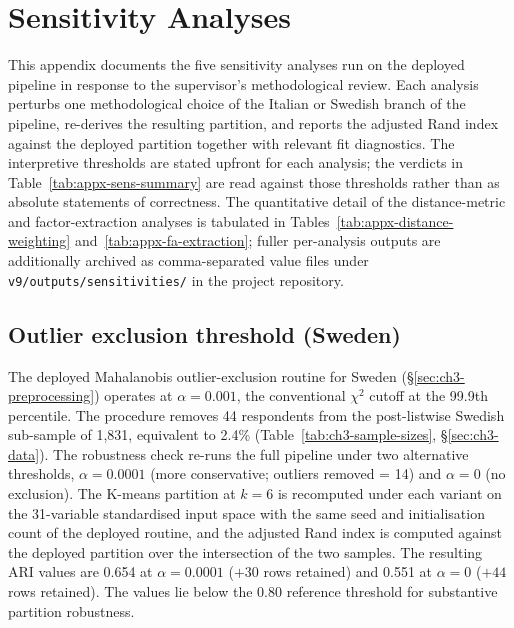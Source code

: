 \chapter{Sensitivity Analyses}
\label{ch:appx-sens}

This appendix documents the five sensitivity analyses run on the deployed pipeline in response to the supervisor's methodological review. Each analysis perturbs one methodological choice of the Italian or Swedish branch of the pipeline, re-derives the resulting partition, and reports the adjusted Rand index against the deployed partition together with relevant fit diagnostics. The interpretive thresholds are stated upfront for each analysis; the verdicts in Table~\ref{tab:appx-sens-summary} are read against those thresholds rather than as absolute statements of correctness. The quantitative detail of the distance-metric and factor-extraction analyses is tabulated in Tables~\ref{tab:appx-distance-weighting} and~\ref{tab:appx-fa-extraction}; fuller per-analysis outputs are additionally archived as comma-separated value files under \texttt{v9/outputs/sensitivities/} in the project repository.


\section{Outlier exclusion threshold (Sweden)}
\label{sec:appx-sens-outlier}

The deployed Mahalanobis outlier-exclusion routine for Sweden (\S\ref{sec:ch3-preprocessing}) operates at $\alpha = 0.001$, the conventional $\chi^2$ cutoff at the 99.9th percentile. The procedure removes 44 respondents from the post-listwise Swedish sub-sample of 1{,}831, equivalent to 2.4\% (Table~\ref{tab:ch3-sample-sizes}, \S\ref{sec:ch3-data}). The robustness check re-runs the full pipeline under two alternative thresholds, $\alpha = 0.0001$ (more conservative; outliers removed = 14) and $\alpha = 0$ (no exclusion). The K-means partition at $k = 6$ is recomputed under each variant on the 31-variable standardised input space with the same seed and initialisation count of the deployed routine, and the adjusted Rand index is computed against the deployed partition over the intersection of the two samples. The resulting ARI values are 0.654 at $\alpha = 0.0001$ ($+30$ rows retained) and 0.551 at $\alpha = 0$ ($+44$ rows retained). The values lie below the 0.80 reference threshold for substantive partition robustness.

